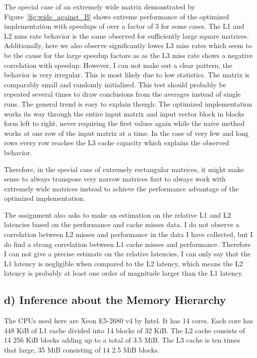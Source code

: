 \documentclass[a4paper, 11pt]{article}
\begin{document}
The special case of an extremely wide matrix demonstrated by
Figure~\ref{fig:wide_against_B} shows extreme performance of the optimized
implementation with speedups of over a factor of 3 for some cases. The L1 and
L2 miss rate behavior is the same observed for sufficiently large square
matrices. Additionally, here we also observe significantly lower L3 miss rates
which seem to be the cause for the large speedup factors as as the L3 miss rate
shows a negative correlation with speedup. However, I can not make out a clear
pattern, the behavior is very irregular. This is most likely due to low
statistics. The matrix is comparably small and randomly initialized. This test
should probably be repeated several times to draw conclusions from the averages
instead of single runs. The general trend is easy to explain though: The
optimized implementation works its way through the entire input matrix and
input vector block in blocks form left to right, never requiring the first
values again while the naive method works at one row of the input matrix at a
time. In the case of very few and long rows every row reaches the L3 cache
capacity which explains the observed behavior.

Therefore, in the special case of extremely rectangular matrices, it might make
sense to always transpose very narrow matrices first to always work with
extremely wide matrices instead to achieve the  performance advantage of the
optimized implementation.

The assignment also asks to make an estimation on the relative L1 and L2
latencies based on the performance and cache misses data. I do not observe a
correlation between L2 misses and performance in the data I have collected, but
I do find a strong correlation between L1 cache misses and performance.
Therefore I can not give a precise estimate on the relative latencies, I can
only say that the L1 latency is negligible when compared to the L2 latency,
which means the L2 latency is probably at least one order of magnitude larger
than the L1 latency.

\FloatBarrier
\subsection*{d) Inference about the Memory Hierarchy}
The CPUs used here are Xeon E5-2680 v4 by Intel. It has 14 cores. Each core has
448 KiB of L1 cache divided into 14 blocks of 32 KiB. The L2 cache consists of
14 256 KiB blocks adding up to a total of 3.5 MiB. The L3 cache is ten times
that large, 35 MiB consisting of 14 2.5 MiB blocks.
\end{document}
